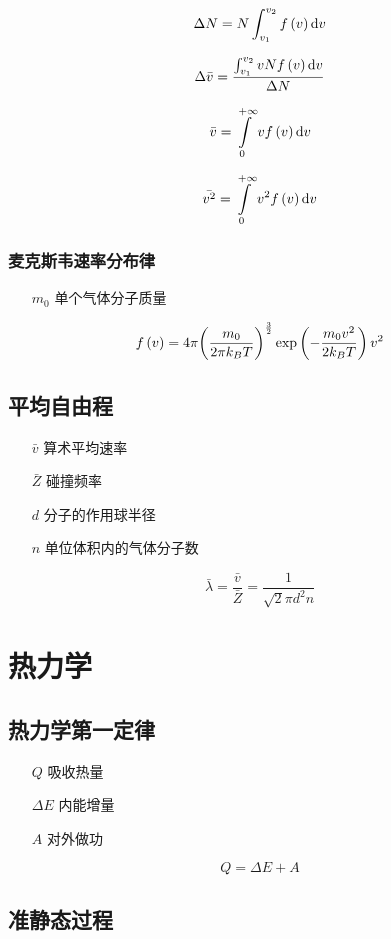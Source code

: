 \documentclass{article}
\begin{document}
\[\Delta N=N\int_{v_1}^{v_2}f\left(v\right)\mathrm d v\]

\[\Delta\bar v=\dfrac{\int_{v_1}^{v_2}vNf\left(v\right)\mathrm d v}{\Delta N}\]

\[\bar v=\int\limits_0^{+\infty}vf\left(v\right)\mathrm d v\]

\[\bar{v^2}=\int\limits_0^{+\infty}v^2f\left(v\right)\mathrm d v\]

\subsubsection{麦克斯韦速率分布律}

\begin{enumerate}
    \item[$m_0$] 单个气体分子质量
\end{enumerate}

\[f\left(v\right)=4\pi{\left(\frac{m_0}{2\pi k_BT}\right)}^{\frac32}\exp\left(-\frac{m_0v^2}{2k_BT}\right)v^2\]

\subsection{平均自由程}

\begin{enumerate}
    \item[$\bar v$] 算术平均速率
    \item[$\bar Z$] 碰撞频率
    \item[$d$] 分子的作用球半径
    \item[$n$] 单位体积内的气体分子数
\end{enumerate}

\[\bar\lambda=\frac{\bar v}{\bar Z}=\frac1{\sqrt2\pi d^2n}\]

\section{热力学}

\subsection{热力学第一定律}

\begin{enumerate}
    \item[$Q$] 吸收热量
    \item[$\Delta E$] 内能增量
    \item[$A$] 对外做功
\end{enumerate}

\[Q=\Delta E+A\]

\subsection{准静态过程}
\end{document}
